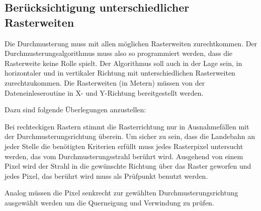 \documentclass[
11pt, %
a4paper, %
oneside, %
pdfspacing, %
headinclude,
BCOR5mm, %
ngerman, %
bibtotocnumbered,
]{scrartcl}
\begin{document}
\subsection{Berücksichtigung unterschiedlicher Rasterweiten}

	Die Durchmusterung muss mit allen möglichen Rasterweiten zurechtkommen. Der Durchmusterungsalgorithmus muss also so programmiert werden, dass die Rasterweite keine Rolle spielt. Der Algorithmus soll auch in der Lage sein, in horizontaler und in vertikaler Richtung mit unterschiedlichen Rasterweiten zurechtzukommen. Die Rasterweiten (in Metern) müssen von der Dateneinleseroutine in X- und Y-Richtung bereitgestellt werden.

	Dazu sind folgende Überlegungen anzustellen:
	
 	\begin{minipage}{\textwidth}
 		\skippingparagraph
 		
		\begin{minipage}[t]{\textwidth-4cm}
			\vspace{0pt}
			Bei rechteckigen Rastern stimmt die Rasterrichtung nur in Ausnahmefällen mit der Durchmusterungsrichtung überein. Um sicher zu sein, dass die Landebahn an jeder Stelle die benötigten Kriterien erfüllt muss jedes Rasterpixel untersucht werden, das vom Durchmusterungsstrahl berührt wird. Ausgehend von einem Pixel wird der Strahl in die gewünschte Richtung über das Raster geworfen und jedes Pixel, das berührt wird muss als Prüfpunkt benutzt werden.
			
			Analog müssen die Pixel senkrecht zur gewählten Durchmusterungsrichtung ausgewählt werden um die Querneigung und Verwindung zu prüfen.
			

\end{minipage}
\end{minipage}
\end{document}
